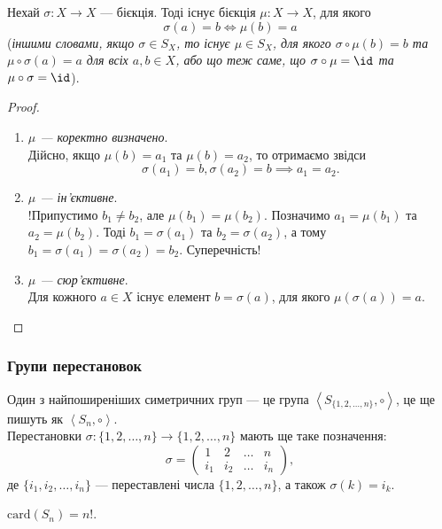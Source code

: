 \documentclass{math_library}
\begin{document}
\begin{lemma}
Нехай $\sigma \colon X \to X$ --- бієкція. Тоді існує бієкція $\mu \colon X \to X$, для якого 
\[
\sigma(a) = b \iff \mu(b) = a
\]
(\textit{іншими словами, якщо $\sigma \in S_X$, то існує $\mu \in S_X$, для якого $\sigma \circ \mu(b) = b$ та $\mu \circ \sigma(a) = a$ для всіх $a,b \in X$, або що теж саме, що $\sigma \circ \mu = \id$ та $\mu \circ \sigma = \id$}).
\end{lemma}

\begin{proof}
\begin{enumerate}[topsep=0pt,label={\Roman*.},wide=0pt]
\item \textit{$\mu$ --- коректно визначено}.\\
Дійсно, якщо $\mu(b) = a_1$ та $\mu(b) = a_2$, то отримаємо звідси \[
\sigma(a_1) = b, \sigma(a_2) = b \implies a_1 = a_2.
\]

\item \textit{$\mu$ --- ін'єктивне}.\\
!Припустимо $b_1 \neq b_2$, але $\mu(b_1) = \mu(b_2)$. Позначимо $a_1 = \mu(b_1)$ та $a_2 = \mu(b_2)$. Тоді $b_1 = \sigma(a_1)$ та $b_2 = \sigma(a_2)$, а тому $b_1 = \sigma(a_1) = \sigma(a_2) = b_2$. Суперечність!

\item \textit{$\mu$ --- сюр'єктивне}.\\
Для кожного $a \in X$ існує елемент $b = \sigma(a)$, для якого $\mu(\sigma(a)) = a$. \qedhere
\end{enumerate}
\end{proof}

\subsubsection{Групи перестановок}
Один з найпоширеніших симетричних груп --- це група $\left<S_{\{1,2,\dots,n\}}, \circ \right>$, це ще пишуть як $\left<S_n, \circ \right>$.\\
Перестановки $\sigma \colon \{1,2,\dots,n\} \to \{1,2,\dots,n\}$ мають ще таке позначення:
\[
 \sigma = \begin{pmatrix}
1 & 2 & \dots & n \\
i_1 & i_2 & \dots & i_n
\end{pmatrix},
\]
де $\{i_1,i_2,\dots,i_n\}$ --- переставлені числа $\{1,2,\dots,n\}$, а також $\sigma(k) = i_k$.

\begin{remark}
$\text{card}(S_n) = n!$.
\end{remark}
\end{document}
